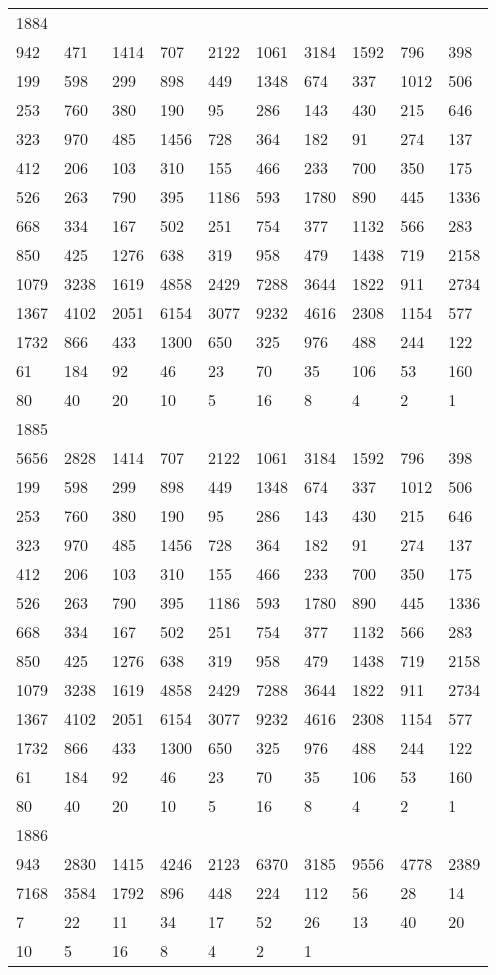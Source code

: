 \begin{longtable}{*{10}{l}}
1884&&&&&&&&&\\
942& 471& 1414& 707& 2122& 1061& 3184& 1592& 796& 398\\
199& 598& 299& 898& 449& 1348& 674& 337& 1012& 506\\
253& 760& 380& 190& 95& 286& 143& 430& 215& 646\\
323& 970& 485& 1456& 728& 364& 182& 91& 274& 137\\
412& 206& 103& 310& 155& 466& 233& 700& 350& 175\\
526& 263& 790& 395& 1186& 593& 1780& 890& 445& 1336\\
668& 334& 167& 502& 251& 754& 377& 1132& 566& 283\\
850& 425& 1276& 638& 319& 958& 479& 1438& 719& 2158\\
1079& 3238& 1619& 4858& 2429& 7288& 3644& 1822& 911& 2734\\
1367& 4102& 2051& 6154& 3077& 9232& 4616& 2308& 1154& 577\\
1732& 866& 433& 1300& 650& 325& 976& 488& 244& 122\\
61& 184& 92& 46& 23& 70& 35& 106& 53& 160\\
80& 40& 20& 10& 5& 16& 8& 4& 2& 1\\

1885&&&&&&&&&\\
5656& 2828& 1414& 707& 2122& 1061& 3184& 1592& 796& 398\\
199& 598& 299& 898& 449& 1348& 674& 337& 1012& 506\\
253& 760& 380& 190& 95& 286& 143& 430& 215& 646\\
323& 970& 485& 1456& 728& 364& 182& 91& 274& 137\\
412& 206& 103& 310& 155& 466& 233& 700& 350& 175\\
526& 263& 790& 395& 1186& 593& 1780& 890& 445& 1336\\
668& 334& 167& 502& 251& 754& 377& 1132& 566& 283\\
850& 425& 1276& 638& 319& 958& 479& 1438& 719& 2158\\
1079& 3238& 1619& 4858& 2429& 7288& 3644& 1822& 911& 2734\\
1367& 4102& 2051& 6154& 3077& 9232& 4616& 2308& 1154& 577\\
1732& 866& 433& 1300& 650& 325& 976& 488& 244& 122\\
61& 184& 92& 46& 23& 70& 35& 106& 53& 160\\
80& 40& 20& 10& 5& 16& 8& 4& 2& 1\\

1886&&&&&&&&&\\
943& 2830& 1415& 4246& 2123& 6370& 3185& 9556& 4778& 2389\\
7168& 3584& 1792& 896& 448& 224& 112& 56& 28& 14\\
7& 22& 11& 34& 17& 52& 26& 13& 40& 20\\
10& 5& 16& 8& 4& 2& 1& \\


\end{longtable}
